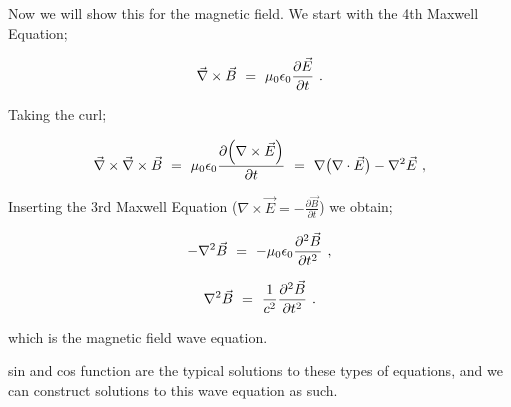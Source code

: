 \documentclass{article}
\begin{document}
Now we will show this for the magnetic field. We start with the 4th Maxwell Equation;

\begin{equation} \label{eb-eq-1002-8}
\vec{\nabla}\times\vec{B} \hspace{0.125cm} = \hspace{0.125cm} \mu_{0} \epsilon_{0} \frac{\partial{\vec{E}}}{\partial{t}} \hspace{0.125cm} .
\end{equation}

Taking the curl;

\begin{equation} \label{eb-eq-1002-9}
\vec{\nabla}\times\vec{\nabla}\times\vec{B} \hspace{0.125cm} = \hspace{0.125cm} \mu_{0} \epsilon_{0} \frac{\partial{\Big(\nabla\times\vec{E}\Big)}}{\partial{t}} \hspace{0.125cm} = \hspace{0.125cm} \nabla\big(\nabla\cdot\vec{E}\big) - \nabla^{2}\vec{E} \hspace{0.125cm} ,
\end{equation}

Inserting the 3rd Maxwell Equation (\begin{math} \nabla\times\vec{E} = - \frac{\partial{\vec{B}}}{\partial{t}} \end{math}) we obtain;

\begin{equation} \label{eb-eq-1002-10}
-\nabla^{2}\vec{B} \hspace{0.125cm} = \hspace{0.125cm} - \mu_{0} \epsilon_{0} \frac{\partial^{2}\vec{B}}{\partial{t}^{2}}  \hspace{0.125cm} ,
\end{equation}

\begin{equation} \label{eb-eq-1002-11}
\nabla^{2}\vec{B} \hspace{0.125cm} = \hspace{0.125cm} \frac{1}{c^2} \frac{\partial^{2}\vec{B}}{\partial{t}^{2}}  \hspace{0.125cm} .
\end{equation}

which is the magnetic field wave equation. 

sin and cos function are the typical solutions to these types of equations, and we can construct solutions to this wave equation as such. 
\end{document}
